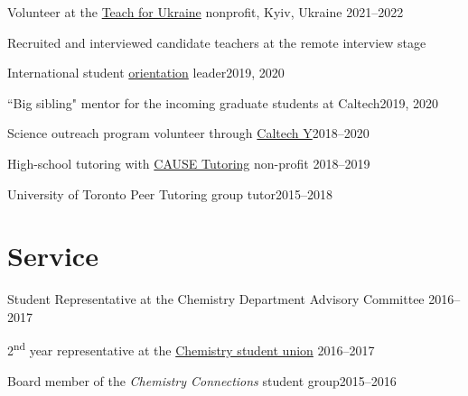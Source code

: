 \documentclass[margin,line]{res}
\newenvironment{list1}{
  \begin{list}{\ding{113}}{%
      \setlength{\itemsep}{0in}
      \setlength{\parsep}{0in} \setlength{\parskip}{0in}
      \setlength{\topsep}{0in} \setlength{\partopsep}{0in} 
      \setlength{\leftmargin}{0.17in}}}{\end{list}}
\begin{document}
\begin{resume}
\vspace{-0.3cm}

Volunteer at the \href{https://teachforukraine.org/en/}{Teach for Ukraine} nonprofit, Kyiv, Ukraine \hfill{2021--2022}

\begin{list1}
\item[]Recruited and interviewed candidate teachers at the remote interview stage
\end{list1}

\vspace{-0.3cm}

International student \href{https://international.caltech.edu/Orientation/isp}{orientation} leader\hfill{2019, 2020}

\vspace{-0.3cm}

``Big sibling" mentor for the incoming graduate students at Caltech\hfill{2019, 2020}

\vspace{-0.3cm}

Science outreach program volunteer through \href{https://www.caltechy.org/student-opportunities}{Caltech Y}\hfill{2018--2020}

\vspace{-0.3cm}

High-school tutoring with \href{https://www.facebook.com/CauseTutoring/?locale=zh_CN&paipv=0&eav=AfapFTOSVzUFy0ircWljNcf8AswCiGwIsBsPs-au8kmxfK99t_d4mxVNzcEVvxME7Jw&_rdr}{CAUSE Tutoring} non-profit \hfill{2018--2019}

\vspace{-0.3cm}

University of Toronto Peer Tutoring group tutor\hfill{2015--2018}

\section{\sc Service}

Student Representative at the Chemistry Department Advisory Committee \hfill{2016--2017}

\vspace*{-2mm}

2\textsuperscript{nd} year representative at the \href{https://csu.sa.utoronto.ca/events-2013-2014/previous-executive-teams/exceutive-team-2015-2016/}{Chemistry student union} \hfill{2016--2017}

\vspace*{-2mm}

Board member of the {\em Chemistry Connections} student group\hfill {2015--2016}

\end{resume}
\end{document}
